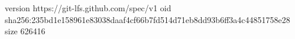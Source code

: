 version https://git-lfs.github.com/spec/v1
oid sha256:235bd1e158961e83038daaf4cf66b7fd514d71eb8dd93b6ff3a4c44851758e28
size 626416
